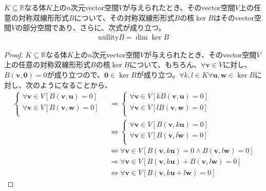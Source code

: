 \documentclass[dvipdfmx]{jsarticle}
\begin{document}
\begin{thm}\label{2.3.5.25}
$K \subseteq \mathbb{R}$なる体$K$上の$n$次元vector空間$V$が与えられたとき、そのvector空間$V$上の任意の対称双線形形式$B$について、その対称双線形形式$B$の核$\ker B$はそのvector空間$V$の部分空間であり、さらに、次式が成り立つ。
\begin{align*}
{\mathrm{nullity}}B = \dim{\ker B}
\end{align*}
\end{thm}
\begin{proof}
$K \subseteq \mathbb{R}$なる体$K$上の$n$次元vector空間$V$が与えられたとき、そのvector空間$V$上の任意の対称双線形形式$B$の核$\ker B$について、もちろん、$\forall\mathbf{v} \in V$に対し、$B\left( \mathbf{v},\mathbf{0} \right) = 0$が成り立つので、$\mathbf{0} \in \ker B$が成り立つ。$\forall k,l \in K\forall\mathbf{u},\mathbf{w} \in \ker B$に対し、次のようになることから、
\begin{align*}
\left\{ \begin{matrix}
\forall\mathbf{v} \in V\left[ B\left( \mathbf{v},\mathbf{u} \right) = 0 \right] \\
\forall\mathbf{v} \in V\left[ B\left( \mathbf{v},\mathbf{w} \right) = 0 \right] \\
\end{matrix} \right.\  &\Rightarrow \left\{ \begin{matrix}
\forall\mathbf{v} \in V\left[ kB\left( \mathbf{v},\mathbf{u} \right) = 0 \right] \\
\forall\mathbf{v} \in V\left[ lB\left( \mathbf{v},\mathbf{w} \right) = 0 \right] \\
\end{matrix} \right.\ \\
&\Leftrightarrow \left\{ \begin{matrix}
\forall\mathbf{v} \in V\left[ B\left( \mathbf{v},k\mathbf{u} \right) = 0 \right] \\
\forall\mathbf{v} \in V\left[ B\left( \mathbf{v},l\mathbf{w} \right) = 0 \right] \\
\end{matrix} \right.\ \\
&\Leftrightarrow \forall\mathbf{v} \in V\left[ B\left( \mathbf{v},k\mathbf{u} \right) = 0 \land B\left( \mathbf{v},l\mathbf{w} \right) = 0 \right]\\
&\Rightarrow \forall\mathbf{v} \in V\left[ B\left( \mathbf{v},k\mathbf{u} \right) + B\left( \mathbf{v},l\mathbf{w} \right) = 0 \right]\\
&\Leftrightarrow \forall\mathbf{v} \in V\left[ B\left( \mathbf{v},k\mathbf{u} + l\mathbf{w} \right) = 0 \right]

\end{align*}
\end{proof}
\end{document}
